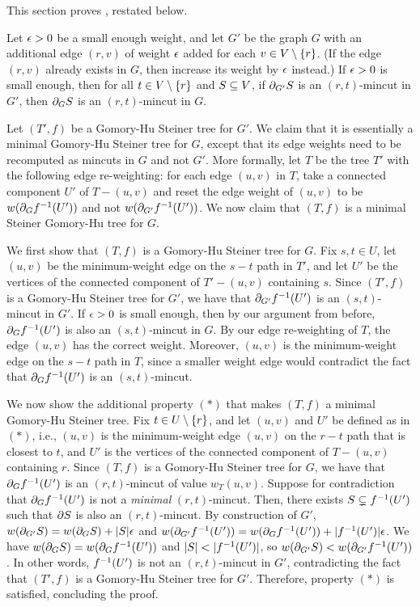 This section proves , restated below.
\Rooted*

Let $\epsilon>0$ be a small enough weight, and let $G'$ be the graph $G$ with an additional edge $(r,v)$ of weight $\epsilon$ added for each $v\in V\setminus\{r\}$. (If the edge $(r,v)$ already exists in $G$, then increase its weight by $\epsilon$ instead.) If $\epsilon>0$ is small enough, then for all $t\in V\setminus\{r\}$ and $S\subseteq V$, if $\partial_{G'}S$ is an $(r,t)$-mincut in $G'$, then $\partial_GS$ is an $(r,t)$-mincut in $G$.

Let $(T',f)$ be a Gomory-Hu Steiner tree for $G'$. We claim that it is essentially a minimal Gomory-Hu Steiner tree for $G$, except that its edge weights need to be recomputed as mincuts in $G$ and not $G'$. More formally, let $T$ be the tree $T'$ with the following edge re-weighting: for each edge $(u,v)$ in $T$, take a connected component $U'$ of $T-(u,v)$ and reset the edge weight of $(u,v)$ to be $w(\partial_Gf^{-1}(U'))$ and not $w(\partial_{G'}f^{-1}(U'))$. We now claim that $(T,f)$ is a minimal Steiner Gomory-Hu tree for $G$.

We first show that $(T,f)$ is a Gomory-Hu Steiner tree for $G$. Fix $s,t\in U$, let $(u,v)$ be the minimum-weight edge on the $s-t$ path in $T'$, and let $U'$ be the vertices of the connected component of $T'-(u,v)$ containing $s$. Since $(T',f)$ is a Gomory-Hu Steiner tree for $G'$, we have that $\partial_{G'}f^{-1}(U')$ is an $(s,t)$-mincut in $G'$. If $\epsilon>0$ is small enough, then by our argument from before, $\partial_Gf^{-1}(U')$ is also an $(s,t)$-mincut in $G$. By our edge re-weighting of $T$, the edge $(u,v)$ has the correct weight. Moreover, $(u,v)$ is the minimum-weight edge on the $s-t$ path in $T$, since a smaller weight edge would contradict the fact that $\partial_Gf^{-1}(U')$ is an $(s,t)$-mincut.

We now show the additional property $(*)$ that makes $(T,f)$ a minimal Gomory-Hu Steiner tree. Fix $t\in U\setminus\{r\}$, and let $(u,v)$ and $U'$ be defined as in $(*)$, i.e., $(u,v)$ is the minimum-weight edge $(u,v)$ on the $r-t$ path that is closest to $t$, and $U'$ is the vertices of the connected component of $T-(u,v)$ containing $r$. Since $(T,f)$ is a Gomory-Hu Steiner tree for $G$, we have that $\partial_Gf^{-1}(U')$ is an $(r,t)$-mincut of value $w_T(u,v)$. Suppose for contradiction that $\partial_Gf^{-1}(U')$ is not a \emph{minimal} $(r,t)$-mincut. Then, there exists $S\subsetneq f^{-1}(U')$ such that $\partial S$ is also an $(r,t)$-mincut. By construction of $G'$, $w(\partial_{G'}S)=w(\partial_GS)+|S|\epsilon$ and $w(\partial_{G'}f^{-1}(U')) = w(\partial_Gf^{-1}(U'))+|f^{-1}(U')|\epsilon$. We have $w(\partial_GS)=w(\partial_Gf^{-1}(U'))$ and $|S|<|f\inv(U')|$, so $w(\partial_{G'}S)<w(\partial_{G'}f^{-1}(U'))$. In other words, $f^{-1}(U')$ is not an $(r,t)$-mincut in $G'$, contradicting the fact that $(T',f)$ is a Gomory-Hu Steiner tree for $G'$. Therefore, property $(*)$ is satisfied, concluding the proof.






